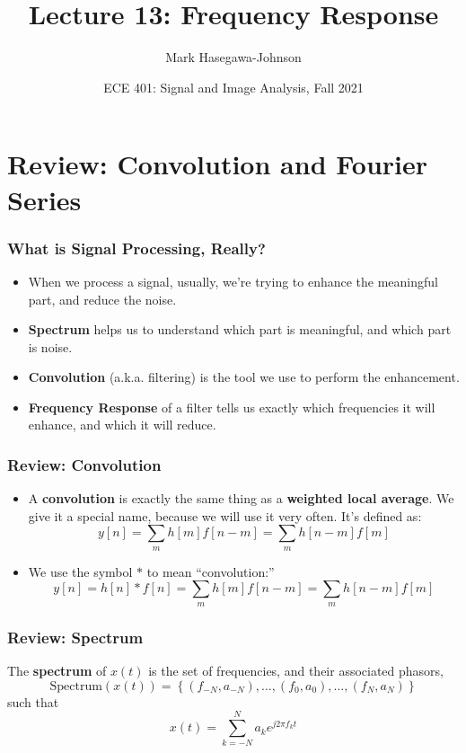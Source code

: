 \documentclass{beamer}
\title{Lecture 13: Frequency Response}
\author{Mark Hasegawa-Johnson}
\date{ECE 401: Signal and Image Analysis, Fall 2021}
\begin{document}
\begin{frame}
  \maketitle
\end{frame}

\begin{frame}
  \tableofcontents
\end{frame}

\section[Review]{Review: Convolution and Fourier Series}
\setcounter{subsection}{1}

\begin{frame}
  \frametitle{What is Signal Processing, Really?}

  \begin{itemize}
  \item When we process a signal, usually, we're trying to
    enhance the meaningful part, and reduce the noise.
  \item {\bf Spectrum} helps us  to understand which part is
    meaningful, and which part is noise.
  \item {\bf Convolution} (a.k.a. filtering) is the tool we use to
    perform the enhancement.
  \item {\bf Frequency Response} of a filter tells us exactly which
    frequencies it will enhance, and which it will reduce.
  \end{itemize}
\end{frame}

\begin{frame}
  \frametitle{Review: Convolution}
  \begin{itemize}
  \item A {\bf convolution} is exactly the same thing as a {\bf weighted local average}.
    We give it a special name, because we will use it very often.  It's defined as:
    \[
    y[n] = \sum_m h[m] f[n-m] = \sum_m h[n-m] f[m]
    \]
  \item 
    We use the symbol $\ast$ to mean ``convolution:''
    \[
    y[n]=h[n]\ast f[n] = \sum_m h[m] f[n-m] = \sum_m h[n-m] f[m]
    \]
  \end{itemize}
\end{frame}

\begin{frame}
  \frametitle{Review: Spectrum}

  The {\bf spectrum} of $x(t)$ is the set of frequencies, and their
  associated phasors,
  \[
  \mbox{Spectrum}\left( x(t) \right) =
  \left\{ (f_{-N},a_{-N}), \ldots, (f_0,a_0), \ldots, (f_N,a_N) \right\}
  \]
  such that
  \[
  x(t) = \sum_{k=-N}^N a_ke^{j2\pi f_kt}
  \]
\end{frame}
\end{document}
